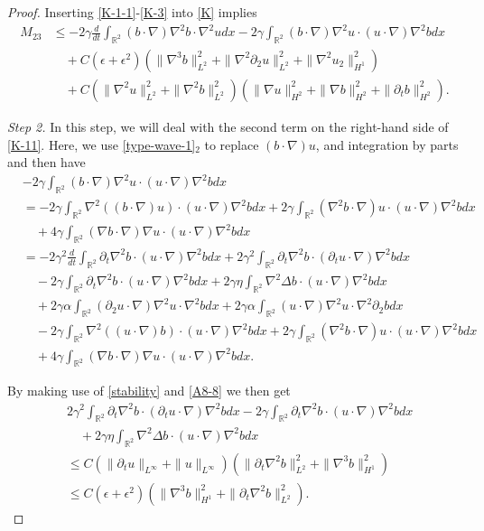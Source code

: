 \documentclass[reqno,11pt]{amsart}
\def\R{\mathbb R}
\numberwithin{Thm}{section}
\begin{document}
\begin{proof}
Inserting \eqref{K-1-1}-\eqref{K-3} into \eqref{K} implies
\begin{align}\label{K-11}
M_{23}
&\leq -2\gamma\frac{d}{dt}\int_{\R^2}(b\cdot\nabla)\nabla^2 b\cdot\nabla^2 udx-2\gamma\int_{\R^2}(b\cdot\nabla)\nabla^2 u\cdot(u \cdot \nabla)\nabla^2 bdx\nonumber\\
&\quad+C(\epsilon+\epsilon^2)(\|\nabla^3b\|_{L^2}^2+\|\nabla^2\partial_2 u\|_{L^2}^2+\|\nabla^2 u_2\|_{H^1}^2)\nonumber\\
&\quad+C(\|\nabla^2 u\|_{{L^2}}^2+\|\nabla^2b\|_{{L^2}}^2)\left(\|\nabla u\|_{H^2}^2+\|\nabla b\|_{H^2}^2+\|\partial_tb\|_{H^2}^2\right).
\end{align}


 {\it {Step 2.}} In this step, we will deal with the second term  on the right-hand side of \eqref{K-11}. Here, we use \eqref{type-wave-1}$_2$ to replace $(b\cdot \nabla) u$, and integration by parts and then have
\begin{align}\label{K-6}
&-2\gamma\int_{\R^2}(b\cdot \nabla)\nabla^2 u\cdot (u\cdot\nabla)\nabla^2 bdx\nonumber\\
&=-2\gamma\int_{\R^2}\nabla^2 ((b\cdot \nabla) u)\cdot( u\cdot\nabla)\nabla^2 bdx+2\gamma\int_{\R^2}(\nabla^2 b\cdot \nabla) u\cdot (u\cdot\nabla)\nabla^2 bdx\nonumber\\
&\quad+4\gamma\int_{\R^2}(\nabla b\cdot \nabla)\nabla u\cdot (u\cdot\nabla)\nabla^2 bdx\nonumber\\
&=-2\gamma^2\frac{d}{dt}\int_{\R^2}\partial_{t}\nabla^2 b\cdot (u\cdot\nabla)\nabla^2 bdx+2\gamma^2\int_{\R^2}\partial_{t}\nabla^2 b\cdot (\partial_{t}u\cdot\nabla)\nabla^2 bdx\nonumber\\
&\quad-2\gamma\int_{\R^2}\partial_{t}\nabla^2b\cdot (u\cdot\nabla )\nabla^2 bdx+2\gamma\eta\int_{\R^2}\nabla^2\Delta b\cdot (u\cdot\nabla)\nabla^2 bdx\nonumber\\
&\quad+2\gamma\alpha\int_{\R^2}(\partial_2u\cdot\nabla)\nabla^2 u\cdot\nabla^2 bdx+2\gamma\alpha\int_{\R^2}(u\cdot\nabla)\nabla^2 u\cdot\nabla^2\partial_2 bdx\nonumber\\
&\quad-2\gamma\int_{\R^2}\nabla^2((u\cdot\nabla) b)\cdot (u\cdot\nabla)\nabla^2 bdx+2\gamma\int_{\R^2}(\nabla^2 b\cdot \nabla) u\cdot (u\cdot\nabla)\nabla^2 bdx\nonumber\\
&\quad+4\gamma\int_{\R^2}(\nabla b\cdot \nabla)\nabla u\cdot (u\cdot\nabla)\nabla^2 bdx.
\end{align}

By making use of \eqref{stability} and \eqref{A8-8} we then get
\begin{align}\label{K-7}
&2\gamma^2\int_{\R^2}\partial_{t}\nabla^2 b\cdot (\partial_{t}u\cdot\nabla)\nabla^2 bdx-2\gamma\int_{\R^2}\partial_{t}\nabla^2b\cdot (u\cdot\nabla )\nabla^2 bdx\nonumber\\
&\quad+2\gamma\eta\int_{\R^2}\nabla^2\Delta b\cdot (u\cdot\nabla)\nabla^2 bdx\nonumber\\
&\leq C(\|\partial_{t} u\|_{L^{\infty}}+\| u\|_{L^{\infty}})(\|\partial_t\nabla^2 b\|_{L^{2}}^2+\|\nabla^3b\|_{H^{1}}^2)\nonumber\\
&\leq  C(\epsilon+\epsilon^2)\left(\|\nabla^3 b\|_{H^1}^2+\|\partial_t\nabla^2 b\|_{L^{2}}^2\right).
\end{align}


\end{proof}
\end{document}
